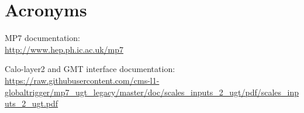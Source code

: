 \documentclass[11pt,a4paper,english,titlepage]{article}
\begin{document}
\doctitlepage{}



\doctoc{}

%
% 


% 
% 



% 
% 
% 

\doctables{}

\docfigures{}


%
\section*{Acronyms}
\begin{acronym}

\end{acronym}

\clearpage

\begin{thebibliography}{00}

MP7 documentation:\\
\url{http://www.hep.ph.ic.ac.uk/mp7}


Calo-layer2 and GMT interface documentation:\\
\url{https://raw.githubusercontent.com/cms-l1-globaltrigger/mp7_ugt_legacy/master/doc/scales_inputs_2_ugt/pdf/scales_inputs_2_ugt.pdf}

\end{thebibliography}


\docindex{}

\end{document}

